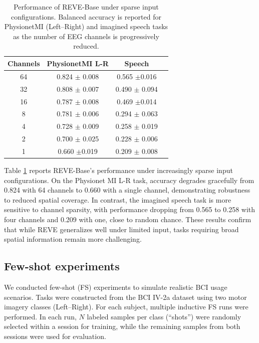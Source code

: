 \documentclass{article}
\begin{document}
\begin{table}[!ht]
    \centering
    \caption{Performance of REVE-Base under sparse input configurations. Balanced accuracy is reported for PhysionetMI (Left–Right) and imagined speech tasks as the number of EEG channels is progressively reduced.}
    \begin{tabular}{cccc}
    \toprule
        \textbf{Channels} & \textbf{PhysionetMI L-R} & \textbf{Speech} \\ \midrule
        64 & 0.824 $\pm$ 0.008 & 0.565 $\pm$0.016 \\
        32 & 0.808 $\pm$ 0.007 & 0.490 $\pm$ 0.094 \\ 
        16 & 0.787 $\pm$ 0.008 & 0.469 $\pm$0.014 \\
        8 & 0.781 $\pm$ 0.006 & 0.294 $\pm$ 0.063 \\
        4 & 0.728 $\pm$ 0.009 & 0.258 $\pm$ 0.019 \\
        2 & 0.700 $\pm$ 0.025 & 0.228 $\pm$ 0.006 \\
        1 & 0.660 $\pm$0.019 & 0.209 $\pm$ 0.008 \\ \bottomrule
    \end{tabular}
    \label{tab:sparse_setups}
\end{table}

Table \ref{tab:sparse_setups} reports REVE-Base’s performance under increasingly sparse input configurations. On the Physionet MI L-R task, accuracy degrades gracefully from 0.824 with 64 channels to 0.660 with a single channel, demonstrating robustness to reduced spatial coverage. In contrast, the imagined speech task is more sensitive to channel sparsity, with performance dropping from 0.565 to 0.258 with four channels and 0.209 with one, close to random chance. These results confirm that while REVE generalizes well under limited input, tasks requiring broad spatial information remain more challenging.

\subsection{Few-shot experiments}
\label{subsec:fs_exps}

We conducted few-shot (FS) experiments to simulate realistic BCI usage scenarios. Tasks were constructed from the BCI IV-2a dataset using two motor imagery classes (Left–Right). For each subject, multiple inductive FS runs were performed. In each run, $N$ labeled samples per class (“shots”) were randomly selected within a session for training, while the remaining samples from both sessions were used for evaluation.
\end{document}
